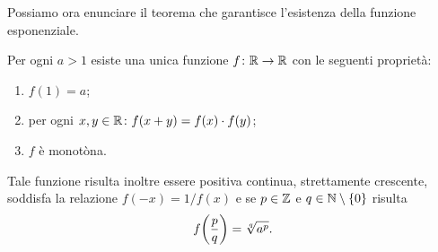 Possiamo ora enunciare il teorema
che garantisce l'esistenza della funzione
esponenziale.

\begin{theorem}
\label{th:esponenziale}%
%
%
Per ogni $a>1$ esiste una unica funzione $f\colon \mathbb R \to \mathbb R$
con le seguenti proprietà:
\begin{enumerate}
\item $f(1) = a$;
\item per ogni $x,y\in \mathbb R\colon f(x+y) = f(x)\cdot f(y)$;
\item $f$ è monotòna.
\end{enumerate}
Tale funzione risulta inoltre essere positiva
continua, strettamente crescente,
soddisfa la relazione $f(-x)= 1/f(x)$ e
se $p\in \mathbb Z$ e $q\in \mathbb N\setminus{\left\{ 0 \right\}}$ risulta
\[
  f{\left( \frac p q \right)} = \sqrt[q]{a^p}.
\]
\end{theorem}
%
